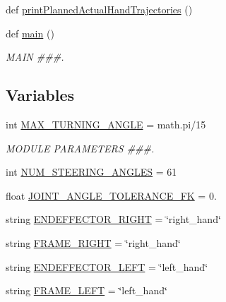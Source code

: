 \begin{DoxyCompactItemize}
\item 
def \mbox{\hyperlink{namespacesteering__trajectory__test_a36fcd1aaba1e9d7984b7ee65898361a4}{print\+Planned\+Actual\+Hand\+Trajectories}} ()
\item 
def \mbox{\hyperlink{namespacesteering__trajectory__test_af0fed4d5ecef01f311c4aead2181fcf2}{main}} ()
\begin{DoxyCompactList}\small\item\em M\+A\+IN \#\#\#. \end{DoxyCompactList}\end{DoxyCompactItemize}
\subsection*{Variables}
\begin{DoxyCompactItemize}
\item 
int \mbox{\hyperlink{namespacesteering__trajectory__test_a15339bd4593dec06f6e4b1312e130171}{M\+A\+X\+\_\+\+T\+U\+R\+N\+I\+N\+G\+\_\+\+A\+N\+G\+LE}} = math.\+pi/15
\begin{DoxyCompactList}\small\item\em M\+O\+D\+U\+LE P\+A\+R\+A\+M\+E\+T\+E\+RS \#\#\#. \end{DoxyCompactList}\item 
int \mbox{\hyperlink{namespacesteering__trajectory__test_a8d15e6ab173748f6fa4674a3749fba83}{N\+U\+M\+\_\+\+S\+T\+E\+E\+R\+I\+N\+G\+\_\+\+A\+N\+G\+L\+ES}} = 61
\item 
float \mbox{\hyperlink{namespacesteering__trajectory__test_abf7b61ddeadab963abd68ea173adfc8f}{J\+O\+I\+N\+T\+\_\+\+A\+N\+G\+L\+E\+\_\+\+T\+O\+L\+E\+R\+A\+N\+C\+E\+\_\+\+FK}} = 0.
\item 
string \mbox{\hyperlink{namespacesteering__trajectory__test_aa8d69f8490ac61125847d4f39de4c1b2}{E\+N\+D\+E\+F\+F\+E\+C\+T\+O\+R\+\_\+\+R\+I\+G\+HT}} = \char`\"{}right\+\_\+hand\char`\"{}
\item 
string \mbox{\hyperlink{namespacesteering__trajectory__test_aa1875faae3fd33c715ad408d7a953dc2}{F\+R\+A\+M\+E\+\_\+\+R\+I\+G\+HT}} = \char`\"{}right\+\_\+hand\char`\"{}
\item 
string \mbox{\hyperlink{namespacesteering__trajectory__test_a7d9b4ec2e88b17ef0e48b865a2d3ef9d}{E\+N\+D\+E\+F\+F\+E\+C\+T\+O\+R\+\_\+\+L\+E\+FT}} = \char`\"{}left\+\_\+hand\char`\"{}
\item 
string \mbox{\hyperlink{namespacesteering__trajectory__test_a9ece9f7cb8c6a1cef2199776861322fe}{F\+R\+A\+M\+E\+\_\+\+L\+E\+FT}} = \char`\"{}left\+\_\+hand\char`\"{}

\end{DoxyCompactItemize}
